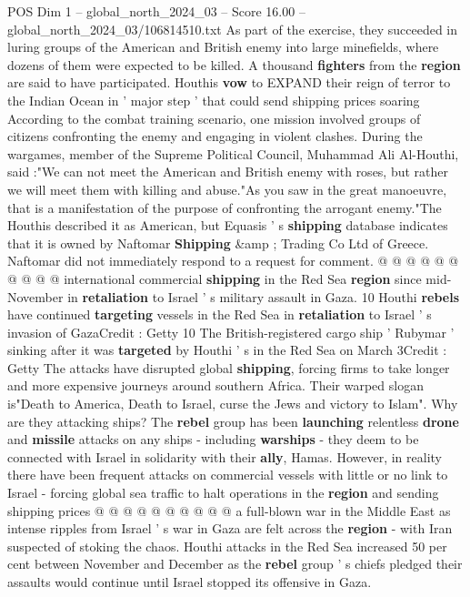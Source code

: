 \begin{textsample}{POS Dim 1 – global\_north\_2024\_03 – Score 16.00 – global\_north\_2024\_03/106814510.txt}  \label{ex:f1_pos_389}
As part of the exercise, they succeeded in luring groups of the American and British enemy into large minefields, where dozens of them were expected to be killed.
A thousand \textbf{fighters} from the \textbf{region} are said to have participated.
Houthis \textbf{vow} to EXPAND their reign of terror to the Indian Ocean in ' major step ' that could send shipping prices soaring According to the combat training scenario, one mission involved groups of citizens confronting the enemy and engaging in violent clashes.
During the wargames, member of the Supreme Political Council, Muhammad Ali Al-Houthi, said :"We can not meet the American and British enemy with roses, but rather we will meet them with killing and abuse."As you saw in the great manoeuvre, that is a manifestation of the purpose of confronting the arrogant enemy."The Houthis described it as American, but Equasis ' s \textbf{shipping} database indicates that it is owned by Naftomar \textbf{Shipping} \&amp ; Trading Co Ltd of Greece.
Naftomar did not immediately respond to a request for comment. @ @ @ @ @ @ @ @ @ @ international commercial \textbf{shipping} in the Red Sea \textbf{region} since mid-November in \textbf{retaliation} to Israel ' s military assault in Gaza. 10 Houthi \textbf{rebels} have continued \textbf{targeting} vessels in the Red Sea in \textbf{retaliation} to Israel ' s invasion of GazaCredit : Getty 10 The British-registered cargo ship ' Rubymar ' sinking after it was \textbf{targeted} by Houthi ' s in the Red Sea on March 3Credit : Getty The attacks have disrupted global \textbf{shipping}, forcing firms to take longer and more expensive journeys around southern Africa.
Their warped slogan is"Death to America, Death to Israel, curse the Jews and victory to Islam".
Why are they attacking ships?
The \textbf{rebel} group has been \textbf{launching} relentless \textbf{drone} and \textbf{missile} attacks on any ships - including \textbf{warships} - they deem to be connected with Israel in solidarity with their \textbf{ally}, Hamas.
However, in reality there have been frequent attacks on commercial vessels with little or no link to Israel - forcing global sea traffic to halt operations in the \textbf{region} and sending shipping prices @ @ @ @ @ @ @ @ @ @ a full-blown war in the Middle East as intense ripples from Israel ' s war in Gaza are felt across the \textbf{region} - with Iran suspected of stoking the chaos.
Houthi attacks in the Red Sea increased 50 per cent between November and December as the \textbf{rebel} group ' s chiefs pledged their assaults would continue until Israel stopped its offensive in Gaza.

\end{textsample}
